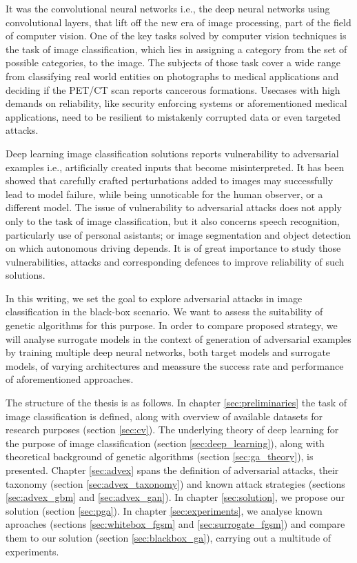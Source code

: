 It was the convolutional neural networks i.e., the deep neural networks using convolutional layers, that lift off the new era of image processing, part of the field of computer vision. One of the key tasks solved by computer vision techniques is the task of image classification, which lies in assigning a category from the set of possible categories, to the image. The subjects of those task cover a wide range from classifying real world entities on photographs to medical applications and deciding if the PET/CT scan reports cancerous formations. Usecases with high demands on reliability, like security enforcing systems or aforementioned medical applications, need to be resilient to mistakenly corrupted data or even targeted attacks.

Deep learning image classification solutions reports vulnerability to adversarial examples i.e., artificially created inputs that become misinterpreted. It has been showed that carefully crafted perturbations added to images may successfully lead to model failure, while being unnoticable for the human observer, or a different model. The issue of vulnerability to adversarial attacks does not apply only to the task of image classification, but it also concerns speech recognition, particularly use of personal asistants; or image segmentation and object detection on which autonomous driving depends. It is of great importance to study those vulnerabilities, attacks and corresponding defences to improve reliability of such solutions.

In this writing, we set the goal to explore adversarial attacks in image classification in the black-box scenario. We want to assess the suitability of genetic algorithms for this purpose. In order to compare proposed strategy, we will analyse surrogate models in the context of generation of adversarial examples by training multiple deep neural networks, both target models and surrogate models, of varying architectures and meassure the success rate and performance of aforementioned approaches.

The structure of the thesis is as follows. In chapter \ref{sec:preliminaries} the task of image classification is defined, along with overview of available datasets for research purposes (section \ref{sec:cv}). The underlying theory of deep learning for the purpose of image classification (section \ref{sec:deep_learning}), along with theoretical background of genetic algorithms (section \ref{sec:ga_theory}), is presented. Chapter \ref{sec:advex} spans the definition of adversarial attacks, their taxonomy (section \ref{sec:advex_taxonomy}) and known attack strategies (sections \ref{sec:advex_gbm} and \ref{sec:advex_gan}). In chapter \ref{sec:solution}, we propose our solution (section \ref{sec:pga}). In chapter \ref{sec:experiments}, we analyse known aproaches (sections \ref{sec:whitebox_fgsm} and \ref{sec:surrogate_fgsm}) and compare them to our solution (section \ref{sec:blackbox_ga}), carrying out a multitude of experiments.
